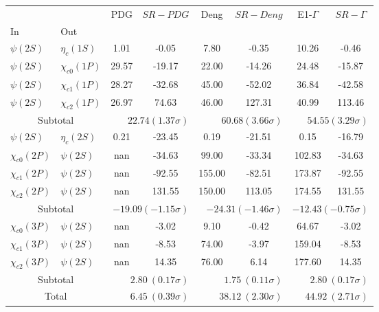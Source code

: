 \begin{tabular}{|l|l|c|c|c|c|c|c|}%
\hline%
&&PDG&$SR-PDG$&Deng&$SR-Deng$&E1-$\Gamma$&$SR-\Gamma$\\%
In&Out&&&&&&\\%
\hline%
$\psi(2S)$&$\eta_{c}(1S)$&1.01&-0.05&7.80&-0.35&10.26&-0.46\\%
$\psi(2S)$&$\chi_{c0}(1P)$&29.57&-19.17&22.00&-14.26&24.48&-15.87\\%
$\psi(2S)$&$\chi_{c1}(1P)$&28.27&-32.68&45.00&-52.02&36.84&-42.58\\%
$\psi(2S)$&$\chi_{c2}(1P)$&26.97&74.63&46.00&127.31&40.99&113.46\\%
\hline%
\hline%
\multicolumn{2}{|c|}{Subtotal}&\multicolumn{2}{|r|}{$22.74 (1.37\sigma)$}&\multicolumn{2}{|r|}{$60.68 (3.66\sigma)$}&\multicolumn{2}{|r|}{$54.55 (3.29\sigma)$}\\%
\hline%
\hline%
$\psi(2S)$&$\eta_{c}(2S)$&0.21&-23.45&0.19&-21.51&0.15&-16.79\\%
$\chi_{c0}(2P)$&$\psi(2S)$&nan&-34.63&99.00&-33.34&102.83&-34.63\\%
$\chi_{c1}(2P)$&$\psi(2S)$&nan&-92.55&155.00&-82.51&173.87&-92.55\\%
$\chi_{c2}(2P)$&$\psi(2S)$&nan&131.55&150.00&113.05&174.55&131.55\\%
\hline%
\hline%
\multicolumn{2}{|c|}{Subtotal}&\multicolumn{2}{|r|}{$-19.09 (-1.15\sigma)$}&\multicolumn{2}{|r|}{$-24.31 (-1.46\sigma)$}&\multicolumn{2}{|r|}{$-12.43 (-0.75\sigma)$}\\%
\hline%
\hline%
$\chi_{c0}(3P)$&$\psi(2S)$&nan&-3.02&9.10&-0.42&64.67&-3.02\\%
$\chi_{c1}(3P)$&$\psi(2S)$&nan&-8.53&74.00&-3.97&159.04&-8.53\\%
$\chi_{c2}(3P)$&$\psi(2S)$&nan&14.35&76.00&6.14&177.60&14.35\\%
\hline%
\hline%
\multicolumn{2}{|c|}{Subtotal}&\multicolumn{2}{|r|}{$2.80~(0.17\sigma)$}&\multicolumn{2}{|r|}{$1.75~(0.11\sigma)$}&\multicolumn{2}{|r|}{$2.80~(0.17\sigma)$}\\%
\hline%
\hline%
\multicolumn{2}{|c|}{Total}&\multicolumn{2}{|r|}{$6.45~(0.39\sigma)$}&\multicolumn{2}{|r|}{$38.12~(2.30\sigma)$}&\multicolumn{2}{|r|}{$44.92~(2.71\sigma)$}\\%
\hline%
\end{tabular}